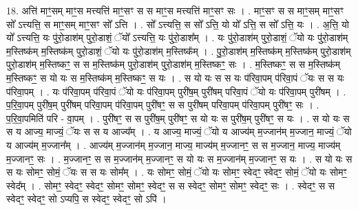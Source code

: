 \documentclass[17pt]{extarticle}
\begin{document}
18. अत्ति॑ माꣳ॒॒सम् माꣳ॒॒स मत्त्यत्ति॑ माꣳ॒॒सꣳ स स माꣳ॒॒स मत्त्यत्ति॑ माꣳ॒॒सꣳ सः । . माꣳ॒॒सꣳ स स माꣳ॒॒सम् माꣳ॒॒सꣳ सो᳚ ऽत्त्यत्ति॒ स माꣳ॒॒सम् माꣳ॒॒सꣳ सो᳚ ऽत्ति । . सो᳚ ऽत्त्यत्ति॒ स सो᳚ ऽत्ति॒ यो यो᳚ ऽत्ति॒ स सो᳚ ऽत्ति॒ यः । . अ॒त्ति॒ यो यो᳚ ऽत्त्यत्ति॒ यः पु॑रो॒डाश॑म् पुरो॒डाशं॒ ॅयो᳚ ऽत्त्यत्ति॒ यः पु॑रो॒डाश᳚म् । . यः पु॑रो॒डाश॑म् पुरो॒डाशं॒ ॅयो यः पु॑रो॒डाश॑म् म॒स्तिष्क॑म् म॒स्तिष्क॑म् पुरो॒डाशं॒ ॅयो यः पु॑रो॒डाश॑म् म॒स्तिष्क᳚म् । . पु॒रो॒डाश॑म् म॒स्तिष्क॑म् म॒स्तिष्क॑म् पुरो॒डाश॑म् पुरो॒डाश॑म् म॒स्तिष्कꣳ॒॒ स स म॒स्तिष्क॑म् पुरो॒डाश॑म् पुरो॒डाश॑म् म॒स्तिष्कꣳ॒॒ सः । . म॒स्तिष्कꣳ॒॒ स स म॒स्तिष्क॑म् म॒स्तिष्कꣳ॒॒ स यो यः स म॒स्तिष्क॑म् म॒स्तिष्कꣳ॒॒ स यः । . स यो यः स स यः प॑रिवा॒पम् प॑रिवा॒पं ॅयः स स यः प॑रिवा॒पम् । . यः प॑रिवा॒पम् प॑रिवा॒पं ॅयो यः प॑रिवा॒पम् पुरी॑ष॒म् पुरी॑षम् परिवा॒पं ॅयो यः प॑रिवा॒पम् पुरी॑षम् । . प॒रि॒वा॒पम् पुरी॑ष॒म् पुरी॑षम् परिवा॒पम् प॑रिवा॒पम् पुरी॑षꣳ॒॒ स स पुरी॑षम् परिवा॒पम् प॑रिवा॒पम् पुरी॑षꣳ॒॒ सः । . प॒रि॒वा॒पमिति॑ परि - वा॒पम् । . पुरी॑षꣳ॒॒ स स पुरी॑ष॒म् पुरी॑षꣳ॒॒ स यो यः स पुरी॑ष॒म् पुरी॑षꣳ॒॒ स यः । . स यो यः स स य आज्य॒ माज्यं॒ ॅयः स स य आज्य᳚म् । . य आज्य॒ माज्यं॒ ॅयो य आज्य॑म् म॒ज्जान॑म् म॒ज्जान॒ माज्यं॒ ॅयो य आज्य॑म् म॒ज्जान᳚म् । . आज्य॑म् म॒ज्जान॑म् म॒ज्जान॒ माज्य॒ माज्य॑म् म॒ज्जानꣳ॒॒ स स म॒ज्जान॒ माज्य॒ माज्य॑म् म॒ज्जानꣳ॒॒ सः । . म॒ज्जानꣳ॒॒ स स म॒ज्जान॑म् म॒ज्जानꣳ॒॒ स यो यः स म॒ज्जान॑म् म॒ज्जानꣳ॒॒ स यः । . स यो यः स स यः सोमꣳ॒॒ सोमं॒ ॅयः स स यः सोम᳚म् । . यः सोमꣳ॒॒ सोमं॒ ॅयो यः सोमꣳ॒॒ स्वेदꣳ॒॒ स्वेदꣳ॒॒ सोमं॒ ॅयो यः सोमꣳ॒॒ स्वेद᳚म् । . सोमꣳ॒॒ स्वेदꣳ॒॒ स्वेदꣳ॒॒ सोमꣳ॒॒ सोमꣳ॒॒ स्वेदꣳ॒॒ स स स्वेदꣳ॒॒ सोमꣳ॒॒ सोमꣳ॒॒ स्वेदꣳ॒॒ सः । . स्वेदꣳ॒॒ स स स्वेदꣳ॒॒ स्वेदꣳ॒॒ सो ऽप्यपि॒ स स्वेदꣳ॒॒ स्वेदꣳ॒॒ सो ऽपि॑ । \newline
\end{document}
